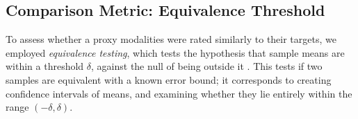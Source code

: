  
\subsection{Comparison Metric: Equivalence Threshold}
To assess whether a proxy modalities were rated similarly to their targets, we employed \emph{equivalence testing}, which tests the hypothesis that sample means are within a threshold $\delta$, against the null of being outside it \cite{Schuirmann1981}.
This tests if two samples are equivalent with a known error bound; it corresponds to creating confidence intervals of means, and examining whether they lie entirely within the range $(-\delta, \delta)$.

